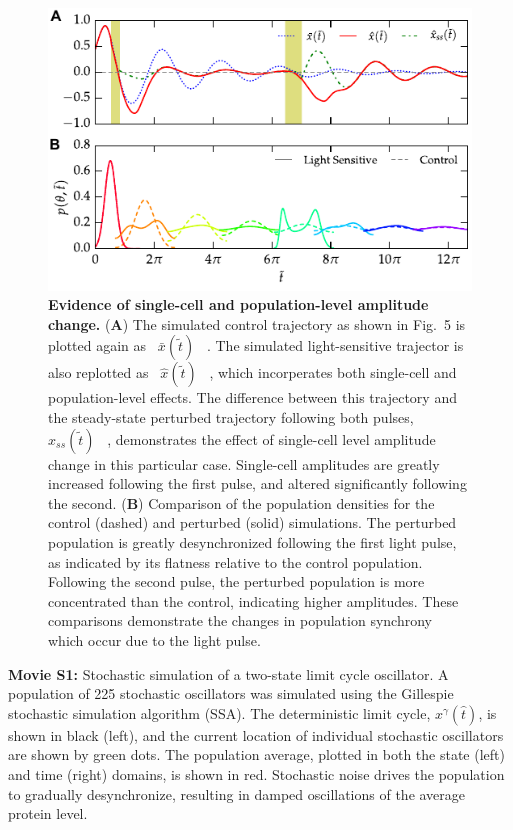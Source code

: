 \documentclass[11pt, letterpaper]{article}
\providecommand{\DIFadd}[1]{{\protect\color{blue}#1}} %
\providecommand{\DIFaddFL}[1]{\DIFadd{#1}} %
\providecommand{\DIFaddendFL}{} %
\begin{document}
\begin{figure}[h!]
  \begin{center}
    \includegraphics[width=.75\textwidth]{figures/figure_S4.pdf}
    \caption{\DIFaddFL{
{}\bfseries \DIFaddFL{Evidence of single-cell and population-level amplitude change.}}
\DIFaddFL{(}{\bfseries \DIFaddFL{A}}\DIFaddFL{) The simulated control trajectory as shown in Fig.~5 is plotted again as \mbox{%
$\bar{x}(\tilde{t})$
}%
.
The simulated light-sensitive trajector is also replotted as \mbox{%
$\hat{x}(\tilde{t})$
}%
, which incorperates both single-cell and population-level effects.
The difference between this trajectory and the steady-state perturbed trajectory following both pulses, \mbox{%
$\hat{x}_{ss}(\tilde{t})$
}%
, demonstrates the effect of single-cell level amplitude change in this particular case. 
Single-cell amplitudes are greatly increased following the first pulse, and altered significantly following the second.
(}{\bfseries \DIFaddFL{B}}\DIFaddFL{)
Comparison of the population densities for the control (dashed) and perturbed (solid) simulations.
The perturbed population is greatly desynchronized following the first light pulse, as indicated by its flatness relative to the control population. 
Following the second pulse, the perturbed population is more concentrated than the control, indicating higher amplitudes. 
These comparisons demonstrate the changes in population synchrony which occur due to the light pulse. 
}}
\DIFaddendFL \end{center}
\end{figure}

\clearpage
{\bfseries Movie S1:} Stochastic simulation of a two-state limit
cycle oscillator. A population of 225 stochastic oscillators was simulated
using the Gillespie stochastic simulation algorithm (SSA). The deterministic
limit cycle, $x^\gamma(\hat{t})$, is shown in black (left), and the current
location of individual stochastic oscillators are shown by green dots. The
population average, plotted in both the state (left) and time (right) domains,
is shown in red. Stochastic noise drives the population to gradually
desynchronize, resulting in damped oscillations of the average protein level.
\\[2ex]
\end{document}
